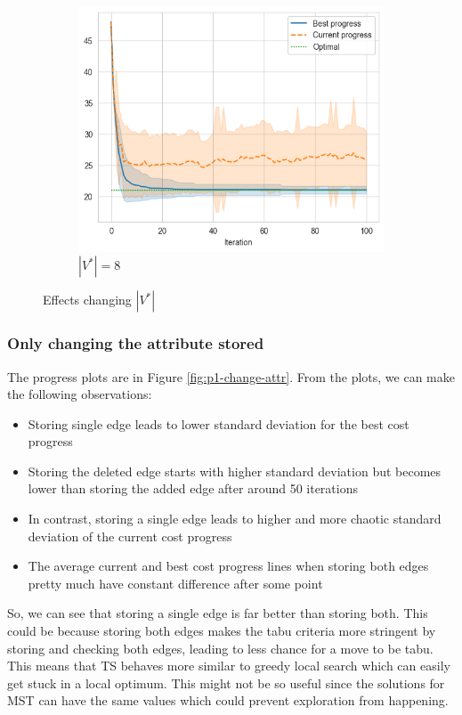 \begin{figure}[ht]
\begin{subfigure}{0.32\textwidth}
        \centering
        \includegraphics[width=\textwidth]{../images/p1/added38s.png}
        \caption{\(|V^*| = 8\)}
    \end{subfigure}
    \hfill

    \caption{Effects changing \(|V^*|\)}
    \label{fig:p1-change-nsize}
\end{figure}

\subsubsection{Only changing the attribute stored}

The progress plots are in Figure \ref{fig:p1-change-attr}. From the plots, we can make the following observations:
\begin{itemize}
    \item Storing single edge leads to lower standard deviation for the best cost progress
    \item Storing the deleted edge starts with higher standard deviation but becomes lower than storing the added edge after around 50 iterations
    \item In contrast, storing a single edge leads to higher and more chaotic standard deviation of the current cost progress
    \item The average current and best cost progress lines when storing both edges pretty much have constant difference after some point
\end{itemize}

So, we can see that storing a single edge is far better than storing both. This could be because storing both edges makes the tabu criteria more stringent by storing and checking both edges, leading to less chance for a move to be tabu. This means that TS behaves more similar to greedy local search which can easily get stuck in a local optimum. This might not be so useful since the solutions for MST can have the same values which could prevent exploration from happening.

